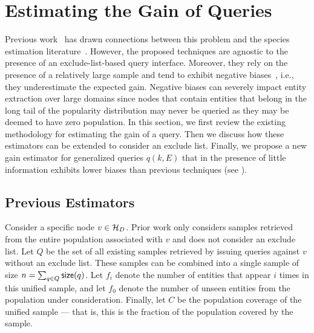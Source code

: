 

\section{Estimating the Gain of Queries}
\label{sec:gainestimators}
Previous work~\cite{trushkowsky:2013} has drawn connections between this problem and the species estimation literature~\cite{chao:1992}. However, the proposed techniques are agnostic to the presence of an exclude-list-based query interface. Moreover, they rely on the presence of a relatively large sample and tend to exhibit negative biases~\cite{hwang:2010, shen:2003}, i.e., they underestimate the expected gain. Negative biases can severely impact entity extraction over large domains since nodes that contain entities that belong in the long tail of the popularity distribution may never be queried as they may be deemed to have zero population. In this section, we first review the existing methodology for estimating the gain of a query. Then we discuss how these estimators can be extended to consider an exclude list. Finally, we propose a new gain estimator for generalized queries $q(k,E)$ that in the presence of little information exhibits lower biases than previous techniques (see ).

\subsection{Previous Estimators}
\label{sec:prevest}
Consider a specific node $v \in \mathcal{H}_D$. Prior work only considers samples retrieved from the entire population associated with $v$ and does not consider an exclude list. Let $Q$ be the set of all existing samples retrieved by issuing queries against $v$ without an exclude list. These samples can be combined into a single sample of size $n = \sum_{q \in Q} {\sf size}(q)$. Let $f_i$ denote the number of entities that appear $i$ times in this unified sample, and let $f_0$ denote the number of unseen entities from the population under consideration. Finally, let $C$ be the population coverage of the unified sample --- that is, this is the fraction of the population covered by the sample.

